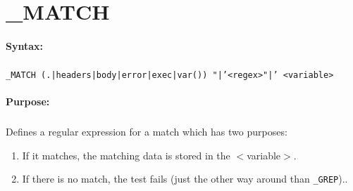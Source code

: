 
\newpage
\section{\_MATCH}
\label{cmd:_MATCH}

\paragraph{Syntax:}
\subparagraph{}
\texttt{\_MATCH (.|headers|body|error|exec|var()) "|'<regex>"|' <variable>}

\paragraph{Purpose:}
\subparagraph{}
Defines a regular expression for a match which has two purposes:

\begin{enumerate}
\item If it matches, the matching data is stored in the $<$variable$>$.
\item If there is no match, the test fails (just the other way around than \texttt{\_GREP})..
\end{enumerate}
